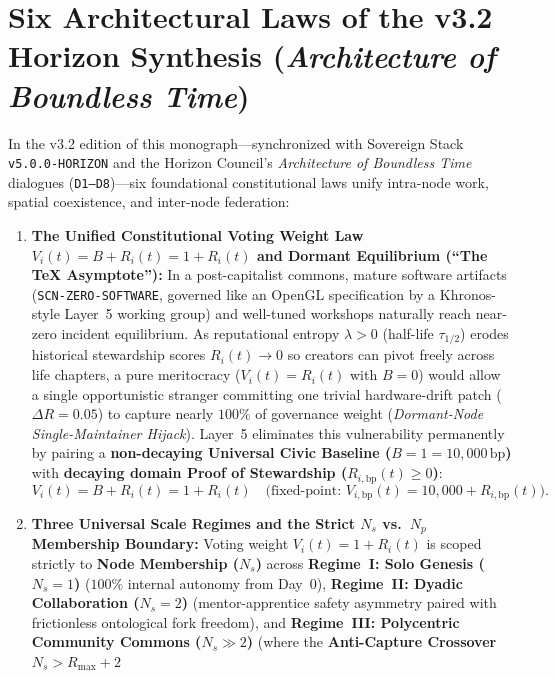 \section*{Six Architectural Laws of the v3.2 Horizon Synthesis (\textit{Architecture of Boundless Time})}

In the v3.2 edition of this monograph---synchronized with Sovereign Stack \texttt{v5.0.0-HORIZON}
and the Horizon Council's \textit{Architecture of Boundless Time} dialogues (\texttt{D1--D8})---six
foundational constitutional laws unify intra-node work, spatial coexistence, and inter-node
federation:

\begin{enumerate}
\item \textbf{The Unified Constitutional Voting Weight Law $V_i(t) = B + R_i(t) = 1 + R_i(t)$ and
        Dormant Equilibrium (``The \TeX{} Asymptote''):} In a post-capitalist commons, mature
        software artifacts (\texttt{SCN-ZERO-SOFTWARE}, governed like an OpenGL specification by a
        Khronos-style Layer~5 working group) and well-tuned workshops naturally reach near-zero
        incident equilibrium. As reputational entropy $\lambda > 0$ (half-life $\tau_{1/2}$) erodes
        historical stewardship scores $R_i(t) \to 0$ so creators can pivot freely across life
        chapters, a pure meritocracy ($V_i(t) = R_i(t)$ with $B = 0$) would allow a single
        opportunistic stranger committing one trivial hardware-drift patch ($\Delta R = 0.05$) to
        capture nearly $100\%$ of governance weight (\textit{Dormant-Node Single-Maintainer Hijack}).
        Layer~5 eliminates this vulnerability permanently by pairing a \textbf{non-decaying
        Universal Civic Baseline ($B = 1 = 10{,}000\,\mathrm{bp}$)} with \textbf{decaying domain
        Proof of Stewardship ($R_{i,\mathrm{bp}}(t) \ge 0$)}:
        \[
            V_i(t) = B + R_i(t) = 1 + R_i(t) \quad
            \bigl(\text{fixed-point: } V_{i,\mathrm{bp}}(t) = 10{,}000 + R_{i,\mathrm{bp}}(t)\bigr).
        \]
\item \textbf{Three Universal Scale Regimes and the Strict $N_s$ vs.\ $N_p$ Membership Boundary:}
        Voting weight $V_i(t) = 1 + R_i(t)$ is scoped strictly to \textbf{Node Membership ($N_s$)}
        across \textbf{Regime~I: Solo Genesis ($N_s = 1$)} ($100\%$ internal autonomy from Day~0),
        \textbf{Regime~II: Dyadic Collaboration ($N_s = 2$)} (mentor-apprentice safety asymmetry
        paired with frictionless ontological fork freedom), and \textbf{Regime~III: Polycentric
        Community Commons ($N_s \gg 2$)} (where the \textbf{Anti-Capture Crossover $N_s > R_{\max} + 2$}

\end{enumerate}
